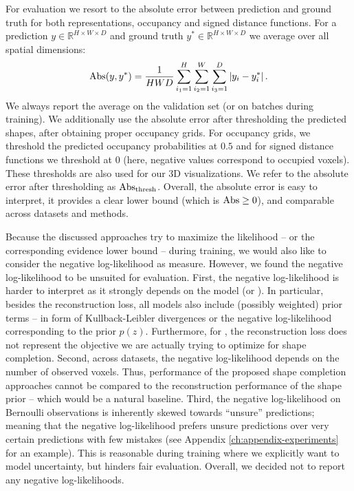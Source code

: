 For evaluation we resort to the absolute error between prediction
and ground truth for both representations, \ie occupancy and signed distance functions.
For a prediction
$y \in \mathbb{R}^{H \times W \times D}$ and ground truth
$y^* \in \mathbb{R}^{H \times W \times D}$ we average over all spatial dimensions:
\begin{align}
  \text{Abs}(y, y^*) = \frac{1}{HWD} \sum_{i_1 = 1}^H \sum_{i_2 = 1}^W \sum_{i_3 = 1}^D \left|y_i - y^*_i\right|.
  \label{eq:experiments-2d-abs}
\end{align}
We always report the average on the validation set (or on batches during training).
We additionally use the absolute error after thresholding the predicted shapes,
\ie after obtaining proper occupancy grids. For occupancy grids, we threshold 
the predicted occupancy probabilities at $0.5$ and
for signed distance functions we threshold at $0$ (here, negative values correspond
to occupied voxels). These thresholds are also used for our 3D visualizations.
We refer to the absolute error after thresholding as $\AbsThr$. Overall,
the absolute error is easy to interpret,
\eg it provides a clear lower bound (which is $\text{Abs} \geq 0$), and comparable
across datasets and methods.

Because the discussed approaches try to maximize the likelihood -- or the
corresponding evidence lower bound -- during training, we would also like
to consider the negative log-likelihood as measure.
However, we found the negative log-likelihood to be unsuited for evaluation.
First, the negative log-likelihood is harder to interpret as it strongly
depends on the model (\eg \VAE or \EVAE). In particular, besides the
reconstruction loss, all models also include (possibly weighted) prior terms
-- \eg in form of Kullback-Leibler divergences or the negative log-likelihood
corresponding to the prior $p(z)$. Furthermore, for \EVAE, the reconstruction loss does not
represent the objective we are actually trying to optimize for shape completion.
Second, across datasets, the negative log-likelihood depends on the number of
observed voxels. Thus, performance of the proposed shape completion approaches
cannot be compared to the reconstruction performance of the shape prior -- 
which would be a natural baseline.
Third, the negative log-likelihood on Bernoulli observations is inherently skewed
towards ``unsure'' predictions; meaning that the negative log-likelihood
prefers unsure predictions over very certain predictions with few mistakes
(see Appendix \ref{ch:appendix-experiments} for an example). This is
reasonable during training where we explicitly want to model uncertainty,
but hinders fair evaluation. Overall, we decided not to report any negative log-likelihoods.




